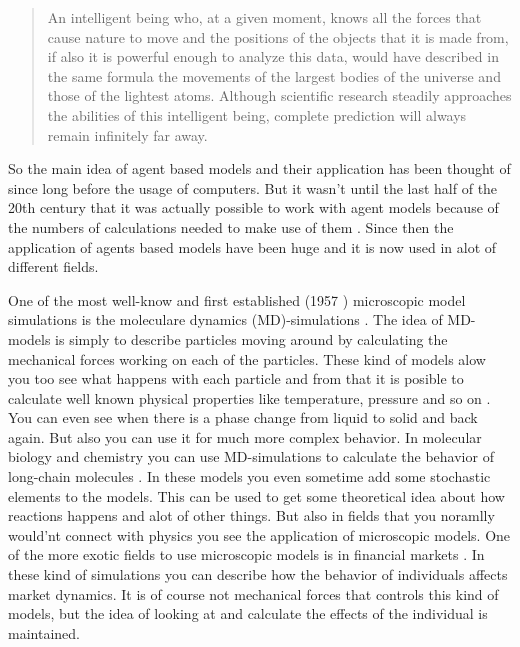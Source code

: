 \begin{quote}
    An intelligent being who, at a given moment, knows all the forces that 
    cause nature to move and the positions of the objects that it is made 
    from, if also it is powerful enough to analyze this data, would have 
    described in the same formula the movements of the largest bodies of the 
    universe and those of the lightest atoms. Although scientific research 
    steadily approaches the abilities of this intelligent being, complete 
    prediction will always remain infinitely far away.
\end{quote}

So the main idea of agent based models and their application has been thought 
of since long before the usage of computers. But it wasn't until the last half 
of the 20th century that it was actually possible to work with agent models 
because of the numbers of calculations needed to make use of 
them \cite{simintro}.  Since then the application of agents based models have 
been huge and it is now used in alot of different fields. 

One of the most well-know and first established (1957 \cite{MDintro}) 
microscopic model simulations is the moleculare dynamics (MD)-simulations 
\cite{MDintro}. The idea of MD-models is simply to describe particles moving 
around by calculating the mechanical forces working on each of the particles.  
These kind of models alow you too see what happens with each particle and from 
that it is posible to calculate well known physical properties like 
temperature, pressure and so on . You can even see when there is a phase 
change from liquid to solid and back again. But also you can use it for much 
more complex behavior. In molecular biology and chemistry you can use 
MD-simulations to calculate the behavior of long-chain molecules \cite{MDbio}.  
In these models you even sometime add some stochastic elements to the models.  
This can be used to get some theoretical idea about how reactions happens and 
alot of other things.
But also in fields that you noramlly would'nt connect with physics you see the 
application of microscopic models.
One of the more exotic fields to use microscopic models is in financial 
markets \cite{finans}.  In these kind of simulations you can describe how the 
behavior of individuals affects market dynamics.  It is of course not 
mechanical forces that controls this kind of models, but the idea of looking 
at and calculate the effects of the individual is maintained. 

